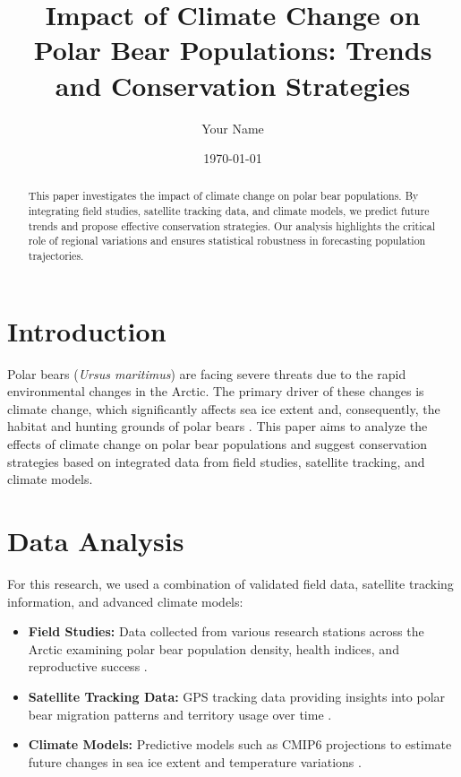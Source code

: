 \documentclass[12pt]{article}
\title{Impact of Climate Change on Polar Bear Populations: Trends and Conservation Strategies}
\author{Your Name}
\date{\today}
\begin{document}
\maketitle

\begin{abstract}
This paper investigates the impact of climate change on polar bear populations. By integrating field studies, satellite tracking data, and climate models, we predict future trends and propose effective conservation strategies. Our analysis highlights the critical role of regional variations and ensures statistical robustness in forecasting population trajectories.
\end{abstract}

\section{Introduction}

Polar bears (\textit{Ursus maritimus}) are facing severe threats due to the rapid environmental changes in the Arctic. The primary driver of these changes is climate change, which significantly affects sea ice extent and, consequently, the habitat and hunting grounds of polar bears \cite{Stirling2002, Derocher2004}. This paper aims to analyze the effects of climate change on polar bear populations and suggest conservation strategies based on integrated data from field studies, satellite tracking, and climate models.

\section{Data Analysis}

For this research, we used a combination of validated field data, satellite tracking information, and advanced climate models:
\begin{itemize}
    \item \textbf{Field Studies:} Data collected from various research stations across the Arctic examining polar bear population density, health indices, and reproductive success \cite{Schweinsburg2006}.
    \item \textbf{Satellite Tracking Data:} GPS tracking data providing insights into polar bear migration patterns and territory usage over time \cite{Laidre2008}.
    \item \textbf{Climate Models:} Predictive models such as CMIP6 projections to estimate future changes in sea ice extent and temperature variations \cite{Collins2013}.
\end{itemize}
\end{document}
